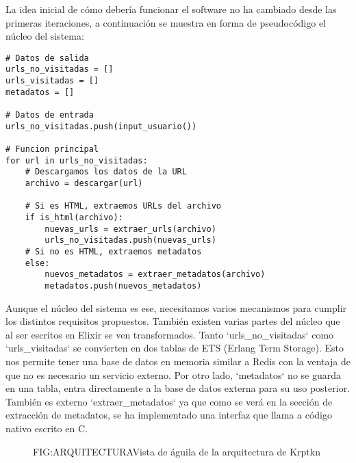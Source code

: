 La idea inicial de c\'omo deber\'ia funcionar el software no ha cambiado desde las primeras iteraciones, a continuación se muestra en forma de pseudocódigo el n\'ucleo del sistema:

\begin{verbatim}
# Datos de salida
urls_no_visitadas = []
urls_visitadas = []
metadatos = []

# Datos de entrada
urls_no_visitadas.push(input_usuario())

# Funcion principal
for url in urls_no_visitadas:
    # Descargamos los datos de la URL
    archivo = descargar(url)
    
    # Si es HTML, extraemos URLs del archivo
    if is_html(archivo):
        nuevas_urls = extraer_urls(archivo)
        urls_no_visitadas.push(nuevas_urls)
    # Si no es HTML, extraemos metadatos
    else:
        nuevos_metadatos = extraer_metadatos(archivo)
        metadatos.push(nuevos_metadatos)

\end{verbatim}

Aunque el núcleo del sistema es ese, necesitamos varios mecanismos para cumplir los distintos requisitos propuestos. También existen varias partes del núcleo que al ser escritos en Elixir se ven transformados. Tanto `urls\_no\_visitadas` como `urls\_visitadas` se convierten en dos tablas de ETS (Erlang Term Storage). Esto nos permite tener una base de datos en memoria similar a Redis con la ventaja de que no es necesario un servicio externo. Por otro lado, `metadatos` no se guarda en una tabla, entra directamente a la base de datos externa para su uso posterior. También es externo `extraer\_metadatos` ya que como se ver\'a en la sección de extracción de metadatos, se ha implementado una interfaz que llama a código nativo escrito en C.

\begin{figure}[Arquitectura general de Krptkn]{FIG:ARQUITECTURA}{Vista de \'aguila de la arquitectura de Krptkn}
\end{figure}